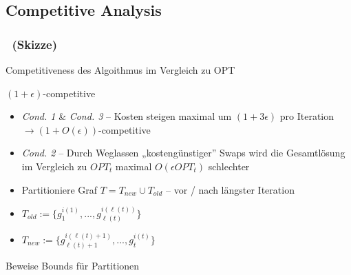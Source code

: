 \subsection{Competitive Analysis}
\begin{frame}
    \frametitle{\insertsubsection~(Skizze)}
    Competitiveness des Algoithmus im Vergleich zu OPT\\
    \vspace{.5em}
    \begin{block}{$(1+\epsilon)$-competitive}
        \vspace{.5em}
        \begin{itemize}
            \itemsep\setlength{.5em}
            \item \emph{Cond. 1} \& \emph{Cond. 3} -- Kosten steigen maximal um $(1+3\epsilon)$ pro Iteration $\rightarrow (1+O(\epsilon))$-competitive
            \item \emph{Cond. 2} -- Durch Weglassen „kostengünstiger” Swaps wird die Gesamtlösung im Vergleich zu $OPT_t$ maximal $O(\epsilon OPT_t)$ schlechter
        \end{itemize}
        \vspace{.1em}
    \end{block}
    \begin{itemize}
        \itemsep\setlength{.5em}
        \item Partitioniere Graf $T = T_{new} \cup T_{old}$ -- vor / nach längster Iteration
        \item $T_{old} := \{g_1^{i(1)}, ..., g_{\ell(t)}^{i(\ell(t))}\}$
        \item $T_{new} := \{g_{\ell(t)+1}^{i(\ell(t)+1)}, ..., g_t^{i(t)}\}$
    \end{itemize}
    Beweise Bounds für Partitionen
\end{frame}

